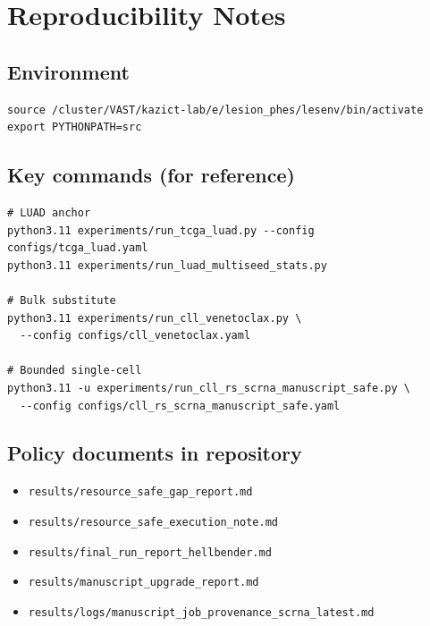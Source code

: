 \documentclass[11pt]{article}
\begin{document}
\section{Reproducibility Notes}

\subsection{Environment}
\begin{verbatim}
source /cluster/VAST/kazict-lab/e/lesion_phes/lesenv/bin/activate
export PYTHONPATH=src
\end{verbatim}

\subsection{Key commands (for reference)}
\begin{verbatim}
# LUAD anchor
python3.11 experiments/run_tcga_luad.py --config configs/tcga_luad.yaml
python3.11 experiments/run_luad_multiseed_stats.py

# Bulk substitute
python3.11 experiments/run_cll_venetoclax.py \
  --config configs/cll_venetoclax.yaml

# Bounded single-cell
python3.11 -u experiments/run_cll_rs_scrna_manuscript_safe.py \
  --config configs/cll_rs_scrna_manuscript_safe.yaml
\end{verbatim}

\subsection{Policy documents in repository}
\begin{itemize}[leftmargin=1.5em]
\item \texttt{results/resource\_safe\_gap\_report.md}
\item \texttt{results/resource\_safe\_execution\_note.md}
\item \texttt{results/final\_run\_report\_hellbender.md}
\item \texttt{results/manuscript\_upgrade\_report.md}
\item \texttt{results/logs/manuscript\_job\_provenance\_scrna\_latest.md}
\end{itemize}
\end{document}
